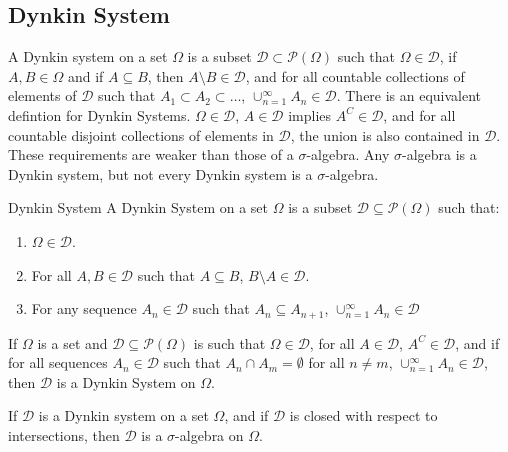     \subsection{Dynkin System}
        A Dynkin system on a set $\Omega$ is a subset
        $\mathcal{D}\subset\mathcal{P}(\Omega)$ such that
        $\Omega\in\mathcal{D}$, if $A,B\in\Omega$ and if
        $A\subseteq{B}$, then $A\setminus{B}\in\mathcal{D}$,
        and for all countable collections of elements of
        $\mathcal{D}$ such that
        $A_{1}\subset{A}_{2}\subset\hdots$,
        $\cup_{n=1}^{\infty}A_{n}\in\mathcal{D}$. There is
        an equivalent defintion for Dynkin Systems.
        $\Omega\in\mathcal{D}$, $A\in\mathcal{D}$ implies
        $A^{C}\in\mathcal{D}$, and for all countable disjoint
        collections of elements in $\mathcal{D}$, the union
        is also contained in $\mathcal{D}$. These requirements
        are weaker than those of a $\sigma$-algebra. Any
        $\sigma$-algebra is a Dynkin system, but not every
        Dynkin system is a $\sigma$-algebra.
        \begin{ldefinition}{Dynkin System}
            A Dynkin System on a set $\Omega$ is a subset
            $\mathcal{D}\subseteq\mathcal{P}(\Omega)$ such that:
            \begin{enumerate}
                \item $\Omega\in\mathcal{D}$.
                \item For all $A,B\in\mathcal{D}$ such that $A\subseteq{B}$,
                      $B\setminus{A}\in\mathcal{D}$.
                \item For any sequence $A_{n}\in\mathcal{D}$ such that
                      $A_{n}\subseteq{A}_{n+1}$,
                      $\cup_{n=1}^{\infty}A_{n}\in\mathcal{D}$
            \end{enumerate}
        \end{ldefinition}
        \begin{theorem}
            If $\Omega$ is a set and $\mathcal{D}\subseteq\mathcal{P}(\Omega)$
            is such that $\Omega\in\mathcal{D}$, for all $A\in\mathcal{D}$,
            $A^{C}\in\mathcal{D}$, and if for all sequences $A_{n}\in\mathcal{D}$
            such that $A_{n}\cap{A}_{m}=\emptyset$ for all $n\ne{m}$,
            $\cup_{n=1}^{\infty}A_{n}\in\mathcal{D}$, then
            $\mathcal{D}$ is a Dynkin System on $\Omega$.
        \end{theorem}
        \begin{theorem}
            If $\mathcal{D}$ is a Dynkin system on a set
            $\Omega$, and if $\mathcal{D}$ is closed with
            respect to intersections, then $\mathcal{D}$
            is a $\sigma$-algebra on $\Omega$.
        \end{theorem}

